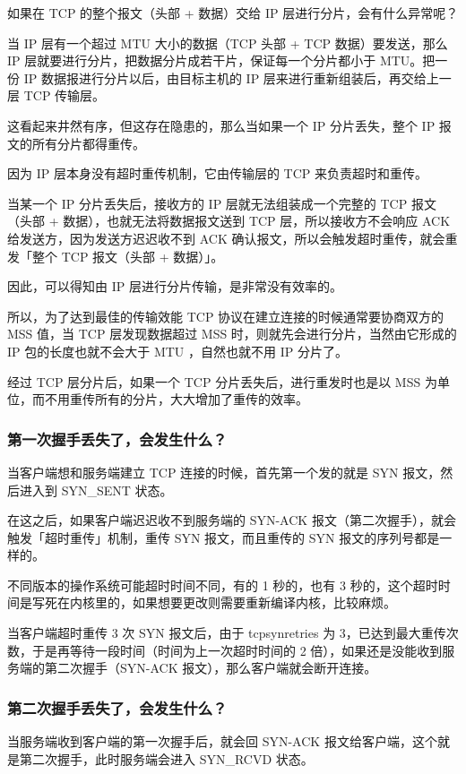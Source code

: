 \documentclass[11pt]{article}
\begin{document}
如果在 TCP 的整个报文（头部 + 数据）交给 IP 层进行分片，会有什么异常呢？

当 IP 层有一个超过 MTU 大小的数据（TCP 头部 + TCP 数据）要发送，那么 IP 层就要进行分片，把数据分片成若干片，保证每一个分片都小于 MTU。把一份 IP 数据报进行分片以后，由目标主机的 IP 层来进行重新组装后，再交给上一层 TCP 传输层。

这看起来井然有序，但这存在隐患的，那么当如果一个 IP 分片丢失，整个 IP 报文的所有分片都得重传。

因为 IP 层本身没有超时重传机制，它由传输层的 TCP 来负责超时和重传。

当某一个 IP 分片丢失后，接收方的 IP 层就无法组装成一个完整的 TCP 报文（头部 + 数据），也就无法将数据报文送到 TCP 层，所以接收方不会响应 ACK 给发送方，因为发送方迟迟收不到 ACK 确认报文，所以会触发超时重传，就会重发「整个 TCP 报文（头部 + 数据）」。

因此，可以得知由 IP 层进行分片传输，是非常没有效率的。

所以，为了达到最佳的传输效能 TCP 协议在建立连接的时候通常要协商双方的 MSS 值，当 TCP 层发现数据超过 MSS 时，则就先会进行分片，当然由它形成的 IP 包的长度也就不会大于 MTU ，自然也就不用 IP 分片了。

经过 TCP 层分片后，如果一个 TCP 分片丢失后，进行重发时也是以 MSS 为单位，而不用重传所有的分片，大大增加了重传的效率。
\subsubsection{第一次握手丢失了，会发生什么？}
\label{sec:org9d628f9}
当客户端想和服务端建立 TCP 连接的时候，首先第一个发的就是 SYN 报文，然后进入到 SYN\_SENT 状态。

在这之后，如果客户端迟迟收不到服务端的 SYN-ACK 报文（第二次握手），就会触发「超时重传」机制，重传 SYN 报文，而且重传的 SYN 报文的序列号都是一样的。

不同版本的操作系统可能超时时间不同，有的 1 秒的，也有 3 秒的，这个超时时间是写死在内核里的，如果想要更改则需要重新编译内核，比较麻烦。

当客户端超时重传 3 次 SYN 报文后，由于 tcpsynretries 为 3，已达到最大重传次数，于是再等待一段时间（时间为上一次超时时间的 2 倍），如果还是没能收到服务端的第二次握手（SYN-ACK 报文），那么客户端就会断开连接。
\subsubsection{第二次握手丢失了，会发生什么？}
\label{sec:org9e7d138}
当服务端收到客户端的第一次握手后，就会回 SYN-ACK 报文给客户端，这个就是第二次握手，此时服务端会进入 SYN\_RCVD 状态。
\end{document}
